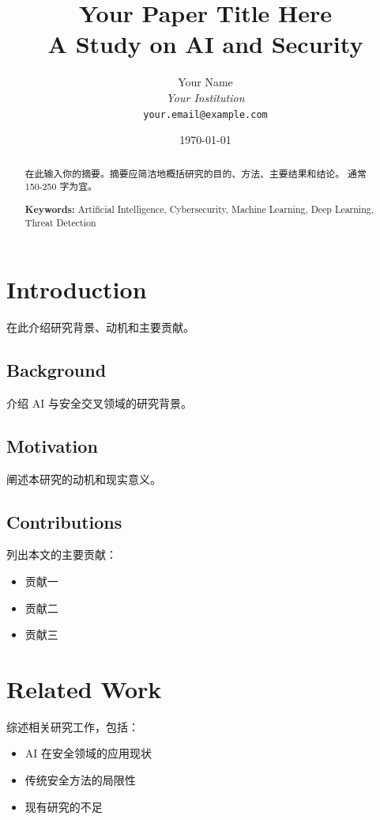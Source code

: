 \documentclass[12pt,a4paper]{article}
\title{\textbf{Your Paper Title Here}\\
\large A Study on AI and Security}
\author{Your Name\\
\textit{Your Institution}\\
\texttt{your.email@example.com}}
\date{\today}
\begin{document}
\maketitle

\begin{abstract}
在此输入你的摘要。摘要应简洁地概括研究的目的、方法、主要结果和结论。
通常 150-250 字为宜。

\medskip
\noindent\textbf{Keywords:} Artificial Intelligence, Cybersecurity, Machine Learning, Deep Learning, Threat Detection
\end{abstract}

\section{Introduction}
\label{sec:introduction}

在此介绍研究背景、动机和主要贡献。

\subsection{Background}
介绍 AI 与安全交叉领域的研究背景。

\subsection{Motivation}
阐述本研究的动机和现实意义。

\subsection{Contributions}
列出本文的主要贡献：
\begin{itemize}
    \item 贡献一
    \item 贡献二
    \item 贡献三
\end{itemize}

\section{Related Work}
\label{sec:related_work}

综述相关研究工作，包括：
\begin{itemize}
    \item AI 在安全领域的应用现状
    \item 传统安全方法的局限性
    \item 现有研究的不足
\end{itemize}
\end{document}
